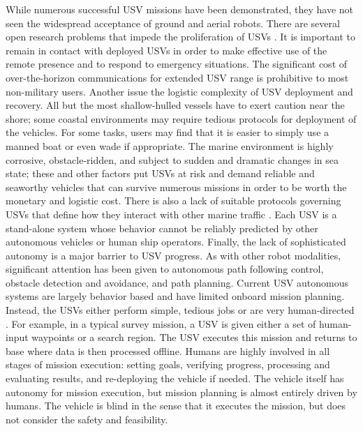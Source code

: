 \documentclass{tamuccthesis}
\begin{document}
While numerous successful USV missions have been demonstrated, they have not seen the widespread acceptance of ground and aerial robots. There are several open research problems that impede the proliferation of USVs \cite{bertram2008unmanned}. It is important to remain in contact with deployed USVs in order to make effective use of the remote presence and to respond to emergency situations. The significant cost of over-the-horizon communications for extended USV range is prohibitive to most non-military users. Another issue the logistic complexity of USV deployment and recovery. All but the most shallow-hulled vessels have to exert caution near the shore; some coastal environments may require tedious protocols for deployment of the vehicles. For some tasks, users may find that it is easier to simply use a manned boat or even wade if appropriate. The marine environment is highly corrosive, obstacle-ridden, and subject to sudden and dramatic changes in sea state; these and other factors put USVs at risk and demand reliable and seaworthy vehicles that can survive numerous missions in order to be worth the monetary and logistic cost. There is also a lack of suitable protocols governing USVs that define how they interact with other marine traffic \cite{manley2008unmanned}. Each USV is a stand-alone system whose behavior cannot be reliably predicted by other autonomous vehicles or human ship operators. Finally, the lack of sophisticated autonomy is a major barrier to USV progress. As with other robot modalities, significant attention has been given to autonomous path following control, obstacle detection and avoidance, and path planning. Current USV autonomous systems are largely behavior based and have limited onboard mission planning. Instead, the USVs either perform simple, tedious jobs or are very human-directed \cite{manley2008unmanned}. For example, in a typical survey mission, a USV is given either a set of human-input waypoints or a search region. The USV executes this mission and returns to base where data is then processed offline. Humans are highly involved in all stages of mission execution: setting goals, verifying progress, processing and evaluating results, and re-deploying the vehicle if needed. The vehicle itself has autonomy for mission execution, but mission planning is almost entirely driven by humans. The vehicle is blind in the sense that it executes the mission, but does not consider the safety and feasibility. 
\end{document}
